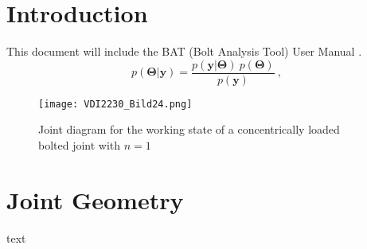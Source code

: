 \chapter{Introduction}
This document will include the BAT (Bolt Analysis Tool) User Manual \cite{ESAPSS} \cite{ECSS_HB_32_23A} \cite{VDI2230_1}.
\begin{equation}
  p(\bm{\Theta}|\bm{y}) = \frac{p(\bm{y}|\bm{\Theta})\ p(\bm{\Theta})}{p(\bm{y})}\ ,
\end{equation}

\begin{figure}[!htpb]
  \centering
  \texttt{[image: VDI2230\_Bild24.png]}
  \caption{Joint diagram for the working state of a concentrically loaded \\ bolted joint with $n=1$ \cite{VDI2230_1}}
  \label{fig:joint_diagram}
\end{figure}

\chapter{Joint Geometry}
text
